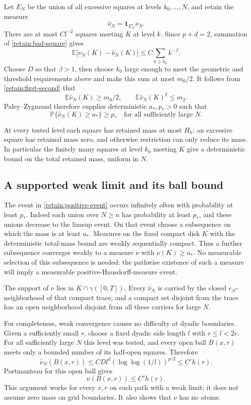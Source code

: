 \documentclass[11pt]{article}
\theoremstyle{definition}
\theoremstyle{remark}
\numberwithin{equation}{section}
\begin{document}
Let $E_N$ be the union of all excessive squares at levels
$k_0,\ldots,N$, and retain the measure
\[
 \widehat\nu_N=\mathbf1_{E_N^c}\nu_N.
\]
There are at most $Cl^{-2}$ squares meeting $K$ at level $k$.
Since $p+d=2$, summation of \eqref{retain:bad-square} gives
\[
 \mathbb E\bigl[\nu_N(K)-\widehat\nu_N(K)\bigr]
 \le C\sum_{k\ge k_0}k^{-\beta}.
\]
Choose $D$ so that $\beta>1$, then choose $k_0$ large enough to meet
the geometric and threshold requirements above and make this sum at most $m_0/2$.
It follows from \eqref{retain:first-second} that
\[
 \mathbb E\widehat\nu_N(K)\ge m_0/2,
 \qquad\mathbb E\widehat\nu_N(K)^2\le m_2.
\]
Paley--Zygmund therefore supplies deterministic $a_*,p_*>0$ such
that
\begin{equation}
 \mathbb P\{\widehat\nu_N(K)\ge a_*\}\ge p_*
 \quad\text{for all sufficiently large }N.
 \label{retain:positive-event}
\end{equation}

At every tested level each square has retained mass at most $H_k$:
an excessive square has retained mass zero, and otherwise restriction
can only reduce its mass.  In particular the finitely many squares
at level $k_0$ meeting $K$ give a deterministic bound on the total
retained mass, uniform in $N$.

\subsection{A supported weak limit and its ball bound}

The event in \eqref{retain:positive-event} occurs infinitely often
with probability at least $p_*$.  Indeed each union over $N\ge n$
has probability at least $p_*$, and these unions decrease to the
limsup event.  On that event choose a subsequence on which the mass
is at least $a_*$.  Measures on the fixed compact disk $K$ with the
deterministic total-mass bound are weakly sequentially compact.
Thus a further subsequence converges weakly to a measure $\nu$ with
$\nu(K)\ge a_*$.  No measurable selection of this subsequence is
needed: the pathwise existence of such a measure will imply a
measurable positive-Hausdorff-measure event.

The support of $\nu$ lies in $K\cap\gamma([0,T])$.  Every
$\widehat\nu_N$ is carried by the closed $e_N$-neighborhood of that
compact trace, and a compact set disjoint from the trace has an open
neighborhood disjoint from all these carriers for large $N$.

For completeness, weak convergence causes no difficulty at dyadic
boundaries.  Given a sufficiently small $r$, choose a fixed dyadic
side length $l$ with $r\le l<2r$.  For all sufficiently large $N$
this level was tested, and every open ball $B(x,r)$ meets only a
bounded number of its half-open squares.  Therefore
\[
 \widehat\nu_N(B(x,r))\le C D l^d(\log\log(1/l))^{p/2}
 \le C' h(r).
\]
Portmanteau for this open ball gives
\begin{equation}
 \nu(B(x,r))\le C'h(r).
 \label{retain:ball}
\end{equation}
This argument works for every $x,r$ on each path with a weak limit;
it does not assume zero mass on grid boundaries.  It also shows that
$\nu$ has no atoms.
\end{document}
